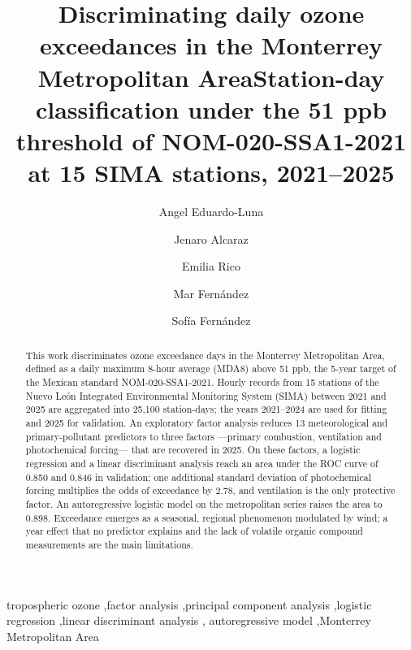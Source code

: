 \documentclass[a4paper]{cas-dc}
\begin{document}
\title[mode=title]{Discriminating daily ozone exceedances in the Monterrey Metropolitan Area}
\title[mode=sub]{Station-day classification under the 51 ppb threshold of NOM-020-SSA1-2021 at 15 SIMA stations, 2021--2025}

\author[1]{Angel Eduardo-Luna}
\author[1]{Jenaro Alcaraz}
\author[1]{Emilia Rico}
\author[1]{Mar Fernández}
\author[1]{Sofía Fernández}


\begin{abstract}
This work discriminates ozone exceedance days in the Monterrey Metropolitan
Area, defined as a daily maximum 8-hour average (MDA8) above 51 ppb, the
5-year target of the Mexican standard NOM-020-SSA1-2021. Hourly records from
15 stations of the Nuevo León Integrated Environmental Monitoring System
(SIMA) between 2021 and 2025 are aggregated into 25,100 station-days; the
years 2021--2024 are used for fitting and 2025 for validation. An exploratory
factor analysis reduces 13 meteorological and primary-pollutant predictors to
three factors ---primary combustion, ventilation and photochemical
forcing--- that are recovered in 2025. On these factors, a logistic regression
and a linear discriminant analysis reach an area under the ROC curve of 0.850
and 0.846 in validation; one additional standard deviation of photochemical
forcing multiplies the odds of exceedance by 2.78, and ventilation is the
only protective factor. An autoregressive logistic model on the metropolitan
series raises the area to 0.898. Exceedance emerges as a seasonal, regional
phenomenon modulated by wind; a year effect that no predictor explains and
the lack of volatile organic compound measurements are the main limitations.
\end{abstract}

\begin{keywords}
tropospheric ozone \sep factor analysis \sep principal component analysis
\sep logistic regression \sep linear discriminant analysis \sep
autoregressive model \sep Monterrey Metropolitan Area
\end{keywords}

\maketitle
{}
\end{document}
